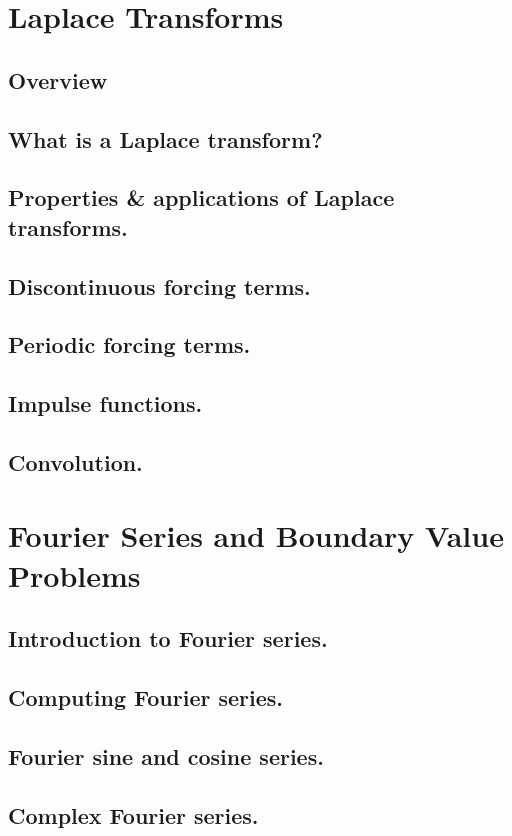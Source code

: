 \documentclass{article}
\begin{document}
\pagebreak
\section{Laplace Transforms}
\subsection*{Overview}

\subsection{What is a Laplace transform?}
\subsection{Properties & applications of Laplace transforms.}
\subsection{Discontinuous forcing terms.}
\subsection{Periodic forcing terms.}
\subsection{Impulse functions.}
\subsection{Convolution.}

\pagebreak
\section{Fourier Series and Boundary Value Problems}

\subsection{Introduction to Fourier series.}
\subsection{Computing Fourier series.}
\subsection{Fourier sine and cosine series.}
\subsection{Complex Fourier series.}
\end{document}
